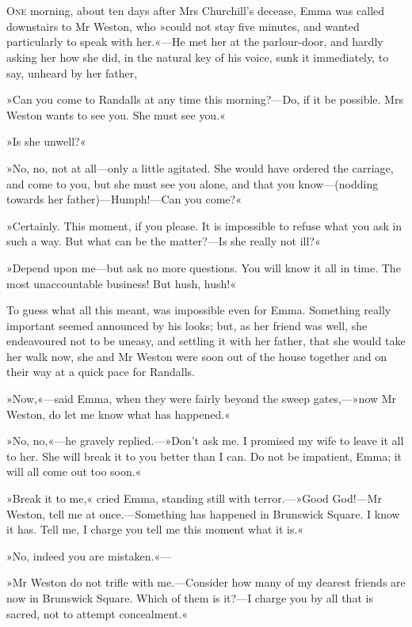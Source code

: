 \chapter[Chapter \thechapter]{}
\lettrine[lines=4,lraise=0.3]{O}{ne} morning, about ten days after Mrs Churchill's decease, Emma was called downstairs to Mr Weston, who »could not stay five minutes, and wanted particularly to speak with her.«—He met her at the parlour-door, and hardly asking her how she did, in the natural key of his voice, sunk it immediately, to say, unheard by her father,

»Can you come to Randalls at any time this morning?—Do, if it be possible. Mrs Weston wants to see you. She must see you.«

»Is she unwell?«

»No, no, not at all—only a little agitated. She would have ordered the carriage, and come to you, but she must see you alone, and that you know—(nodding towards her father)—Humph!—Can you come?«

»Certainly. This moment, if you please. It is impossible to refuse what you ask in such a way. But what can be the matter?—Is she really not ill?«

»Depend upon me—but ask no more questions. You will know it all in time. The most unaccountable business! But hush, hush!«

To guess what all this meant, was impossible even for Emma. Something really important seemed announced by his looks; but, as her friend was well, she endeavoured not to be uneasy, and settling it with her father, that she would take her walk now, she and Mr Weston were soon out of the house together and on their way at a quick pace for Randalls.

»Now,«—said Emma, when they were fairly beyond the sweep gates,—»now Mr Weston, do let me know what has happened.«

»No, no,«—he gravely replied.—»Don't ask me. I promised my wife to leave it all to her. She will break it to you better than I can. Do not be impatient, Emma; it will all come out too soon.«

»Break it to me,« cried Emma, standing still with terror.—»Good God!—Mr Weston, tell me at once.—Something has happened in Brunswick Square. I know it has. Tell me, I charge you tell me this moment what it is.«

»No, indeed you are mistaken.«—

»Mr Weston do not trifle with me.—Consider how many of my dearest friends are now in Brunswick Square. Which of them is it?—I charge you by all that is sacred, not to attempt concealment.«

